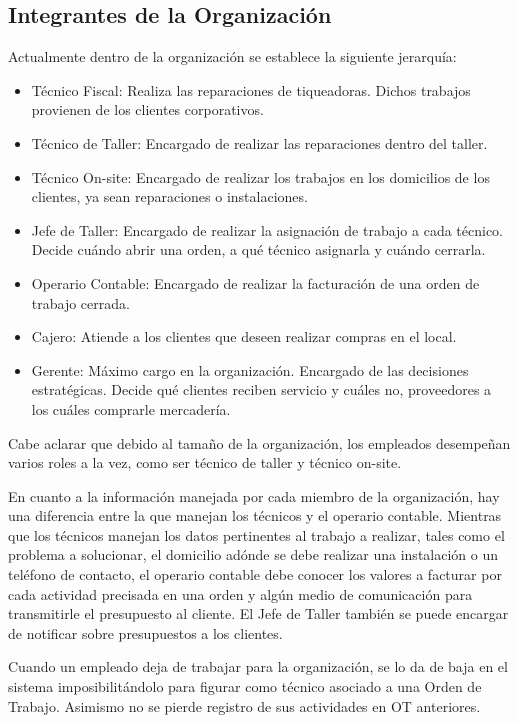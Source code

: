\documentclass[12pt]{extarticle}
\begin{document}
\begin{spacing}{1.2}
        \subsection{Integrantes de la Organización}
        Actualmente dentro de la organización se establece la siguiente jerarquía:
        \begin{itemize}
            \item Técnico Fiscal: Realiza las reparaciones de tiqueadoras. Dichos trabajos provienen de los clientes corporativos.
            \item Técnico de Taller: Encargado de realizar las reparaciones dentro del taller.
            \item Técnico On-site: Encargado de realizar los trabajos en los domicilios de los clientes, ya sean reparaciones o instalaciones.
            \item Jefe de Taller: Encargado de realizar la asignación de trabajo a cada técnico. Decide cuándo abrir una orden, a qué técnico asignarla y cuándo cerrarla.
            \item Operario Contable: Encargado de realizar la facturación de una orden de trabajo cerrada.
            \item Cajero: Atiende a los clientes que deseen realizar compras en el local.
            \item Gerente: Máximo cargo en la organización. Encargado de las decisiones estratégicas. Decide qué clientes reciben servicio y cuáles no, proveedores a los cuáles comprarle mercadería. 
        \end{itemize}
        

        Cabe aclarar que debido al tamaño de la organización, los empleados desempeñan varios roles a la vez, como ser técnico de taller y técnico on-site.

        En cuanto a la información manejada por cada miembro de la organización, hay una diferencia entre la que manejan los técnicos y el operario contable. Mientras que los técnicos manejan los datos pertinentes al trabajo a realizar, tales como el problema a solucionar, el domicilio adónde se debe realizar una instalación o un teléfono de contacto, el operario contable debe conocer los valores a facturar por cada actividad precisada en una orden y algún medio de comunicación para transmitirle el presupuesto al cliente. El Jefe de Taller también se puede encargar de notificar sobre presupuestos a los clientes.

        Cuando un empleado deja de trabajar para la organización, se lo da de baja en el sistema imposibilitándolo para figurar como técnico asociado a una Orden de Trabajo. Asimismo no se pierde registro de sus actividades en OT anteriores. 


\end{spacing}
\end{document}
